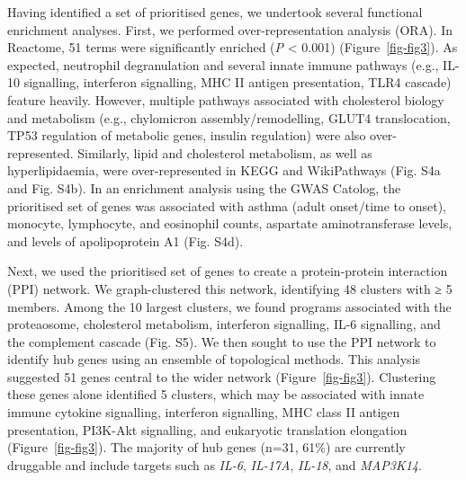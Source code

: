 \documentclass[
  11,
  a4paper,
]{article}
\begin{document}
Having identified a set of prioritised genes, we undertook several
functional enrichment analyses. First, we performed over-representation
analysis (ORA). In Reactome, 51 terms were significantly enriched
(\emph{P} \textless{} 0.001) (Figure~\ref{fig-fig3}). As expected,
neutrophil degranulation and several innate immune pathways (e.g., IL-10
signalling, interferon signalling, MHC II antigen presentation, TLR4
cascade) feature heavily. However, multiple pathways associated with
cholesterol biology and metabolism (e.g., chylomicron
assembly/remodelling, GLUT4 translocation, TP53 regulation of metabolic
genes, insulin regulation) were also over-represented. Similarly, lipid
and cholesterol metabolism, as well as hyperlipidaemia, were
over-represented in KEGG and WikiPathways (Fig. S4a and Fig. S4b). In an
enrichment analysis using the GWAS Catolog, the prioritised set of genes
was associated with asthma (adult onset/time to onset), monocyte,
lymphocyte, and eosinophil counts, aspartate aminotransferase levels,
and levels of apolipoprotein A1 (Fig. S4d).

Next, we used the prioritised set of genes to create a protein-protein
interaction (PPI) network. We graph-clustered this network, identifying
48 clusters with ≥ 5 members. Among the 10 largest clusters, we found
programs associated with the proteaosome, cholesterol metabolism,
interferon signalling, IL-6 signalling, and the complement cascade (Fig.
S5). We then sought to use the PPI network to identify hub genes using
an ensemble of topological methods. This analysis suggested 51 genes
central to the wider network (Figure~\ref{fig-fig3}). Clustering these
genes alone identified 5 clusters, which may be associated with innate
immune cytokine signalling, interferon signalling, MHC class II antigen
presentation, PI3K-Akt signalling, and eukaryotic translation elongation
(Figure~\ref{fig-fig3}). The majority of hub genes (n=31, 61\%) are
currently druggable and include targets such as \emph{IL-6},
\emph{IL-17A}, \emph{IL-18}, and \emph{MAP3K14}.
\end{document}
